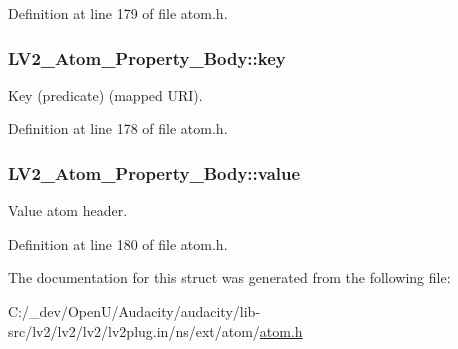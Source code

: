 Definition at line 179 of file atom.\+h.

\subsubsection[{\texorpdfstring{key}{key}}]{ L\+V2\+\_\+\+Atom\+\_\+\+Property\+\_\+\+Body\+::key}\hypertarget{struct_l_v2___atom___property___body_ac9fd00fcf59a6e0a1f09d27f0ff9b6cf}{}\label{struct_l_v2___atom___property___body_ac9fd00fcf59a6e0a1f09d27f0ff9b6cf}
Key (predicate) (mapped U\+RI). 

Definition at line 178 of file atom.\+h.

\subsubsection[{\texorpdfstring{value}{value}}]{ L\+V2\+\_\+\+Atom\+\_\+\+Property\+\_\+\+Body\+::value}\hypertarget{struct_l_v2___atom___property___body_ab7eda1204d1ebad5d7134636ab7b2991}{}\label{struct_l_v2___atom___property___body_ab7eda1204d1ebad5d7134636ab7b2991}
Value atom header. 

Definition at line 180 of file atom.\+h.



The documentation for this struct was generated from the following file\+:\begin{DoxyCompactItemize}
\item 
C\+:/\+\_\+dev/\+Open\+U/\+Audacity/audacity/lib-\/src/lv2/lv2/lv2/lv2plug.\+in/ns/ext/atom/\hyperlink{atom_8h}{atom.\+h}\end{DoxyCompactItemize}
